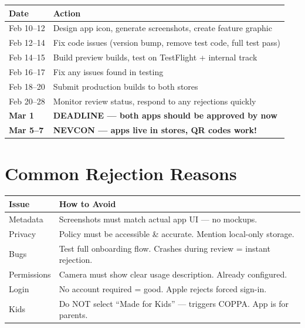 \documentclass[9pt,letterpaper]{article}
\begin{document}
\begin{tabularx}{\textwidth}{@{}l X@{}}
\toprule
\textbf{Date} & \textbf{Action} \\
\midrule
Feb 10--12 & Design app icon, generate screenshots, create feature graphic \\
Feb 12--14 & Fix code issues (version bump, remove test code, full test pass) \\
Feb 14--15 & Build preview builds, test on TestFlight + internal track \\
Feb 16--17 & Fix any issues found in testing \\
Feb 18--20 & Submit production builds to both stores \\
Feb 20--28 & Monitor review status, respond to any rejections quickly \\
\textbf{Mar 1} & \textbf{DEADLINE --- both apps should be approved by now} \\
\textbf{Mar 5--7} & \textbf{NEVCON --- apps live in stores, QR codes work!} \\
\bottomrule
\end{tabularx}

\vspace{0.6em}
\section*{Common Rejection Reasons}

\begin{tabularx}{\textwidth}{@{}l X@{}}
\toprule
\textbf{Issue} & \textbf{How to Avoid} \\
\midrule
Metadata & Screenshots must match actual app UI --- no mockups. \\
Privacy & Policy must be accessible \& accurate. Mention local-only storage. \\
Bugs & Test full onboarding flow. Crashes during review = instant rejection. \\
Permissions & Camera must show clear usage description. Already configured. \\
Login & No account required = good. Apple rejects forced sign-in. \\
Kids & Do NOT select ``Made for Kids'' --- triggers COPPA. App is for parents. \\
\bottomrule
\end{tabularx}

\vspace{1em}
\end{document}
